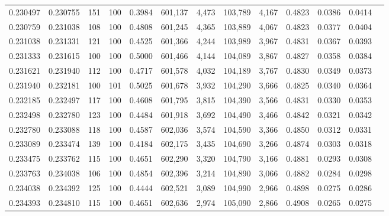 \begin{tabular}{rrrrrrrrrrrrr}
0.230497 & 0.230755 &   151 & 100 &                                     0.3984 & 601,137 &   4,473 & 103,789 &   4,167 & 0.4823 & 0.0386 & 0.0414 \\
0.230759 & 0.231038 &   108 & 100 &                                     0.4808 & 601,245 &   4,365 & 103,889 &   4,067 & 0.4823 & 0.0377 & 0.0404 \\
0.231038 & 0.231331 &   121 & 100 &                                     0.4525 & 601,366 &   4,244 & 103,989 &   3,967 & 0.4831 & 0.0367 & 0.0393 \\
0.231333 & 0.231615 &   100 & 100 &                                     0.5000 & 601,466 &   4,144 & 104,089 &   3,867 & 0.4827 & 0.0358 & 0.0384 \\
0.231621 & 0.231940 &   112 & 100 &                                     0.4717 & 601,578 &   4,032 & 104,189 &   3,767 & 0.4830 & 0.0349 & 0.0373 \\
0.231940 & 0.232181 &   100 & 101 &                                     0.5025 & 601,678 &   3,932 & 104,290 &   3,666 & 0.4825 & 0.0340 & 0.0364 \\
0.232185 & 0.232497 &   117 & 100 &                                     0.4608 & 601,795 &   3,815 & 104,390 &   3,566 & 0.4831 & 0.0330 & 0.0353 \\
0.232498 & 0.232780 &   123 & 100 &                                     0.4484 & 601,918 &   3,692 & 104,490 &   3,466 & 0.4842 & 0.0321 & 0.0342 \\
0.232780 & 0.233088 &   118 & 100 &                                     0.4587 & 602,036 &   3,574 & 104,590 &   3,366 & 0.4850 & 0.0312 & 0.0331 \\
0.233089 & 0.233474 &   139 & 100 &                                     0.4184 & 602,175 &   3,435 & 104,690 &   3,266 & 0.4874 & 0.0303 & 0.0318 \\
0.233475 & 0.233762 &   115 & 100 &                                     0.4651 & 602,290 &   3,320 & 104,790 &   3,166 & 0.4881 & 0.0293 & 0.0308 \\
0.233763 & 0.234038 &   106 & 100 &                                     0.4854 & 602,396 &   3,214 & 104,890 &   3,066 & 0.4882 & 0.0284 & 0.0298 \\
0.234038 & 0.234392 &   125 & 100 &                                     0.4444 & 602,521 &   3,089 & 104,990 &   2,966 & 0.4898 & 0.0275 & 0.0286 \\
0.234393 & 0.234810 &   115 & 100 &                                     0.4651 & 602,636 &   2,974 & 105,090 &   2,866 & 0.4908 & 0.0265 & 0.0275 \\

\end{tabular}
